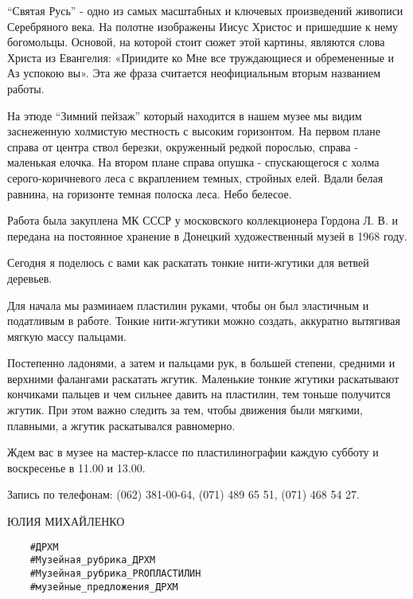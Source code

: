 \enquote{Святая Русь} - одно из самых масштабных и ключевых произведений
живописи Серебряного века. На полотне изображены Иисус Христос и пришедшие к
нему богомольцы. Основой, на которой стоит сюжет этой картины, являются слова
Христа из Евангелия: «Приидите ко Мне все труждающиеся и обремененные и Аз
успокою вы». Эта же фраза считается неофициальным вторым названием работы.

На этюде \enquote{Зимний пейзаж} который находится в нашем музее мы видим
заснеженную холмистую местность с высоким горизонтом.  На первом плане справа
от центра ствол березки,  окруженный редкой порослью,  справа - маленькая
елочка. На втором плане  справа опушка - спускающегося с холма
серого-коричневого леса с вкраплением темных,  стройных елей.  Вдали белая
равнина,  на горизонте темная полоска леса.  Небо белесое.

Работа была закуплена МК СССР у московского коллекционера Гордона Л. В. и
передана на постоянное хранение в Донецкий художественный музей в 1968 году.


Сегодня я поделюсь с вами как раскатать тонкие нити-жгутики для ветвей
деревьев.

Для начала мы разминаем пластилин руками, чтобы он был эластичным и податливым
в работе. Тонкие нити-жгутики можно создать, аккуратно вытягивая мягкую массу
пальцами.

Постепенно ладонями, а затем и пальцами рук, в большей степени, средними и
верхними фалангами раскатать жгутик. Маленькие тонкие жгутики раскатывают
кончиками пальцев и чем сильнее давить на пластилин, тем тоньше получится
жгутик. При этом важно следить за тем, чтобы движения были мягкими, плавными, а
жгутик раскатывался равномерно.

Ждем вас в музее на мастер-классе по пластилинографии каждую субботу и
воскресенье в 11.00 и 13.00.

Запись по телефонам: (062) 381-00-64, (071) 489 65 51, (071) 468 54 27.
 
ЮЛИЯ МИХАЙЛЕНКО
 
\begin{verbatim}
	#ДРХМ
	#Музейная_рубрика_ДРХМ
	#Музейная_рубрика_PROПЛАСТИЛИН
	#музейные_предложения_ДРХМ
\end{verbatim}
